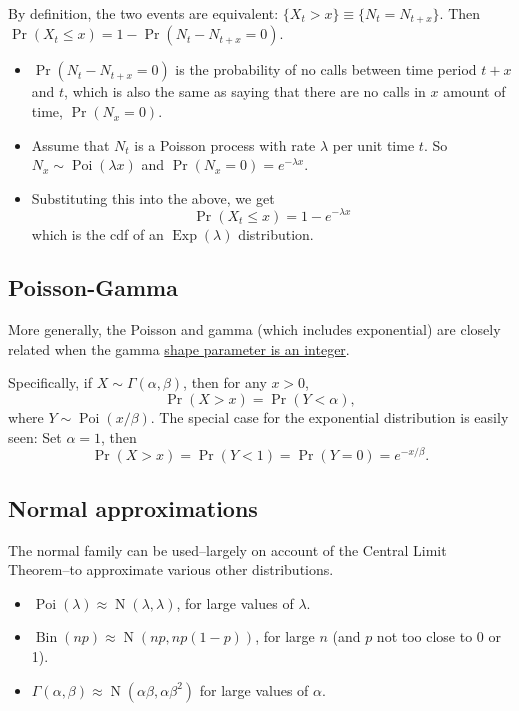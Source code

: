 \documentclass[
]{book}
\providecommand{\tightlist}{%
  \setlength{\itemsep}{0pt}\setlength{\parskip}{0pt}}
\DeclareMathOperator{\N}{N}
\DeclareMathOperator{\Bin}{Bin}
\DeclareMathOperator{\Pois}{Poi}
\DeclareMathOperator{\Exp}{Exp}
\theoremstyle{definition}
\theoremstyle{definition}
\theoremstyle{definition}
\theoremstyle{definition}
\theoremstyle{remark}
\begin{document}
By definition, the two events are equivalent: \(\{X_t > x \} \equiv \{N_t = N_{t+x}\}\).
Then \(\Pr(X_t \leq x) = 1 - \Pr(N_t - N_{t+x}=0)\).

\begin{itemize}
\tightlist
\item
  \(\Pr(N_t - N_{t+x}=0)\) is the probability of no calls between time period \(t+x\) and \(t\), which is also the same as saying that there are no calls in \(x\) amount of time, \(\Pr(N_x=0)\).
\item
  Assume that \(N_t\) is a Poisson process with rate \(\lambda\) per unit time \(t\). So \(N_x \sim \Pois(\lambda x)\) and \(\Pr(N_x=0) = e^{-\lambda x}\).
\item
  Substituting this into the above, we get
  \[
  \Pr(X_t \leq x) = 1 - e^{-\lambda x}
  \]
  which is the cdf of an \(\Exp(\lambda)\) distribution.
\end{itemize}

\hypertarget{poisson-gamma}{%
\subsection{Poisson-Gamma}\label{poisson-gamma}}

More generally, the Poisson and gamma (which includes exponential) are closely related when the gamma \underline{shape parameter is an integer}.

Specifically, if \(X\sim\Gamma(\alpha,\beta)\), then for any \(x>0\),
\[
\Pr(X>x) = \Pr(Y<\alpha),
\]
where \(Y\sim\Pois(x/\beta)\).
The special case for the exponential distribution is easily seen: Set \(\alpha=1\), then
\[
\Pr(X>x) = \Pr(Y<1) = \Pr(Y=0) = e^{-x/\beta}.
\]

\hypertarget{normal-approximations}{%
\subsection{Normal approximations}\label{normal-approximations}}

The normal family can be used--largely on account of the Central Limit Theorem--to approximate various other distributions.

\begin{itemize}
\tightlist
\item
  \(\Pois(\lambda) \approx \N(\lambda,\lambda)\), for large values of \(\lambda\).
\item
  \(\Bin(np) \approx \N(np,np(1-p))\), for large \(n\) (and \(p\) not too close to 0 or 1).
\item
  \(\Gamma(\alpha,\beta) \approx \N(\alpha\beta, \alpha\beta^2)\) for large values of \(\alpha\).
\end{itemize}
\end{document}
